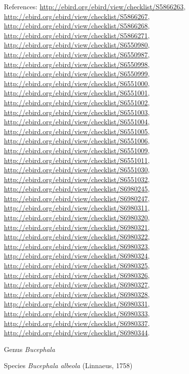 \documentclass[9pt, article]{memoir}
\begin{document}
\begin{multicols}{2}
\vspace{6pt}References: 
\url{http://ebird.org/ebird/view/checklist/S5866263}, 
\url{http://ebird.org/ebird/view/checklist/S5866267}, 
\url{http://ebird.org/ebird/view/checklist/S5866268}, 
\url{http://ebird.org/ebird/view/checklist/S5866271}, 
\url{http://ebird.org/ebird/view/checklist/S6550980}, 
\url{http://ebird.org/ebird/view/checklist/S6550987}, 
\url{http://ebird.org/ebird/view/checklist/S6550998}, 
\url{http://ebird.org/ebird/view/checklist/S6550999}, 
\url{http://ebird.org/ebird/view/checklist/S6551000}, 
\url{http://ebird.org/ebird/view/checklist/S6551001}, 
\url{http://ebird.org/ebird/view/checklist/S6551002}, 
\url{http://ebird.org/ebird/view/checklist/S6551003}, 
\url{http://ebird.org/ebird/view/checklist/S6551004}, 
\url{http://ebird.org/ebird/view/checklist/S6551005}, 
\url{http://ebird.org/ebird/view/checklist/S6551006}, 
\url{http://ebird.org/ebird/view/checklist/S6551009}, 
\url{http://ebird.org/ebird/view/checklist/S6551011}, 
\url{http://ebird.org/ebird/view/checklist/S6551030}, 
\url{http://ebird.org/ebird/view/checklist/S6551032}, 
\url{http://ebird.org/ebird/view/checklist/S6980245}, 
\url{http://ebird.org/ebird/view/checklist/S6980247}, 
\url{http://ebird.org/ebird/view/checklist/S6980311}, 
\url{http://ebird.org/ebird/view/checklist/S6980320}, 
\url{http://ebird.org/ebird/view/checklist/S6980321}, 
\url{http://ebird.org/ebird/view/checklist/S6980322}, 
\url{http://ebird.org/ebird/view/checklist/S6980323}, 
\url{http://ebird.org/ebird/view/checklist/S6980324}, 
\url{http://ebird.org/ebird/view/checklist/S6980325}, 
\url{http://ebird.org/ebird/view/checklist/S6980326}, 
\url{http://ebird.org/ebird/view/checklist/S6980327}, 
\url{http://ebird.org/ebird/view/checklist/S6980328}, 
\url{http://ebird.org/ebird/view/checklist/S6980331}, 
\url{http://ebird.org/ebird/view/checklist/S6980333}, 
\url{http://ebird.org/ebird/view/checklist/S6980337}, 
\url{http://ebird.org/ebird/view/checklist/S6980344}.

\vspace{6pt}\noindent\hspace{30pt}Genus \textit{Bucephala}


\vspace{6pt}\noindent\hspace{36pt}Species \textit{Bucephala albeola} (Linnaeus, 1758)



\end{multicols}
\end{document}
